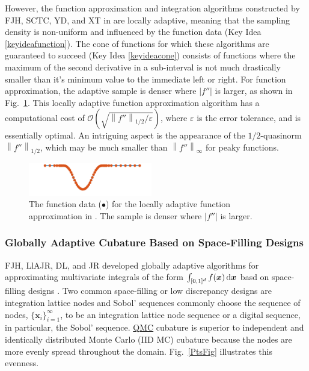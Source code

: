 \documentclass[11pt]{NSFamsart}
\newcommand{\QMC}{\hyperlink{QMClink}{QMC}\xspace}
\newcommand{\bx}{{\boldsymbol{x}}}
\def\dif{\textup{d}}
\def\abs#1{\ensuremath{\left \lvert #1 \right \rvert}}
\newcommand{\norm}[2][{}]{\ensuremath{\left \lVert #2 \right \rVert}_{#1}}
\newcommand{\Order}{\mathcal{O}}
\begin{document}
However, the function approximation and integration algorithms constructed by FJH, SCTC, YD, and XT in \cite{ChoEtal17a} are locally adaptive, meaning that the sampling density is non-uniform and influenced by the function data (Key Idea \ref{keyideafunction}).  The cone of functions for which these algorithms are guaranteed to succeed (Key Idea \ref{keyideacone}) consists of functions where the maximum of the second derivative in a sub-interval is not much drastically smaller than it's minimum value to the immediate left or right.  For function approximation, the adaptive sample is denser where $\abs{f''}$ is larger, as shown in Fig.\ \ref{localadaptfig}.  This locally adaptive function approximation algorithm has a computational cost of $\Order\left(\sqrt{\norm[1/2]{f''}/\varepsilon} \right)$, where $\varepsilon$ is the error tolerance, and is essentially optimal.  An intriguing aspect is the appearance of the $1/2$-quasinorm $\norm[1/2]{f''}$, which may be much smaller than 
$\norm[\infty]{f''}$ for peaky functions.

\begin{figure}[h]
	\centering
	\vspace{-1ex}
	\includegraphics[width = 0.48\textwidth]{ProgramsImages/sampling-funappxg.png}

	\vspace{-2ex}
	\caption{The function data ({\color{MATLABOrange}$\bullet$}) for the locally adaptive 
	function approximation in \cite{ChoEtal17a}.  The sample is denser where $\abs{f''}$ is larger. \label{localadaptfig}}
\end{figure}

\subsubsection[QMCsec]{Globally Adaptive Cubature Based on Space-Filling Designs} \hypertarget{QMClink}{}
\label{sec:QMC}
FJH, LlAJR, DL, and JR
developed globally adaptive algorithms for approximating multivariate integrals of the form  $\int_{[0,1]^d} f(\bx) \, \dif \bx$ basd on space-filling designs \cite{HicJim16a,HicEtal17a,JimHic16a}.  Two common space-filling or low discrepancy designs are integration lattice nodes and Sobol' sequences \cite{DicEtal14a} commonly 
choose the 
sequence of nodes, $\{\bx_i\}_{i=1}^\infty$, to be an integration lattice node sequence  or a digital
sequence, in particular, the Sobol' sequence.  \QMC cubature is superior to 
independent and identically distributed Monte Carlo (\hypertarget{IIDMClink}{IID MC}) cubature 
because the nodes are more 
evenly spread throughout the domain.   Fig.\ \ref{PtsFig} illustrates this evenness.
\end{document}
